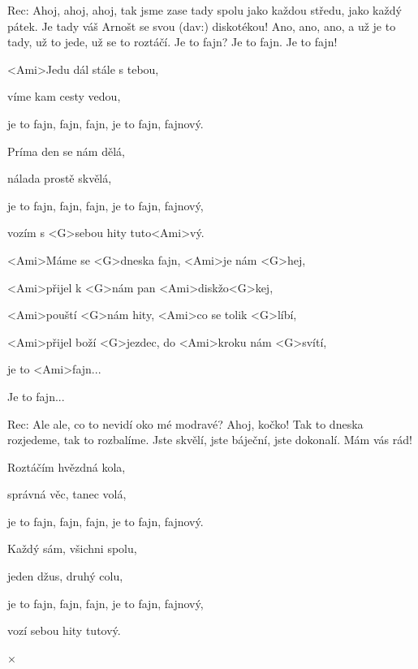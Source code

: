 


Rec: Ahoj, ahoj, ahoj, tak jsme zase tady spolu jako každou středu, jako každý pátek. Je tady váš Arnošt se svou (dav:) diskotékou! Ano, ano, ano, a už je to tady, už to jede, už se to roztáčí. Je to fajn? Je to fajn. Je to fajn!




\zs
<Ami>Jedu dál stále s tebou,

víme kam cesty vedou,

je to fajn, fajn, fajn, je to fajn, fajnový.

Príma den se nám dělá,

nálada prostě skvělá,

je to fajn, fajn, fajn, je to fajn, fajnový,

vozím s <G>sebou hity tuto<Ami>vý.
\ks




\zr
<Ami>Máme se <G>dneska fajn, <Ami>je nám <G>hej,

<Ami>přijel k <G>nám pan <Ami>diskžo<G>kej,

<Ami>pouští <G>nám hity, <Ami>co se tolik <G>líbí,

<Ami>přijel boží <G>jezdec, do <Ami>kroku nám <G>svítí,

je to <Ami>fajn...

Je to fajn...
\kr

Rec: Ale ale, co to nevidí oko mé modravé? Ahoj, kočko! Tak to dneska rozjedeme, tak to rozbalíme. Jste skvělí, jste báječní, jste dokonalí. Mám vás rád!


\zs
Roztáčím hvězdná kola,

správná věc, tanec volá,

je to fajn, fajn, fajn, je to fajn, fajnový.

Každý sám, všichni spolu,

jeden džus, druhý colu,

je to fajn, fajn, fajn, je to fajn, fajnový,

vozí sebou hity tutový.
\ks

× \kr

\kp
